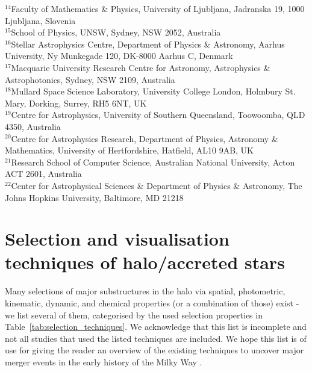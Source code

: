\documentclass[fleqn,usenatbib]{mnras}
\begin{document}
$^{14}$Faculty of Mathematics \& Physics, University of Ljubljana, Jadranska 19, 1000 Ljubljana, Slovenia\\
$^{15}$School of Physics, UNSW, Sydney, NSW 2052, Australia\\
$^{16}$Stellar Astrophysics Centre, Department of Physics \& Astronomy, Aarhus University, Ny Munkegade 120, DK-8000 Aarhus C, Denmark\\
$^{17}$Macquarie University Research Centre for Astronomy, Astrophysics \& Astrophotonics, Sydney, NSW 2109, Australia\\
$^{18}$Mullard Space Science Laboratory, University College London, Holmbury St. Mary, Dorking, Surrey, RH5 6NT, UK\\
$^{19}$Centre for Astrophysics, University of Southern Queensland, Toowoomba, QLD 4350, Australia\\
$^{20}$Centre for Astrophysics Research, Department of Physics, Astronomy \& Mathematics, University of Hertfordshire, Hatfield, AL10 9AB, UK\\
$^{21}$Research School of Computer Science, Australian National University, Acton ACT 2601, Australia\\
$^{22}$Center for Astrophysical Sciences \& Department of Physics \& Astronomy, The Johns Hopkins University, Baltimore, MD 21218


\appendix

\section{Selection and visualisation techniques of halo/accreted stars} \label{sec:selection_techniques}


Many selections of major substructures in the halo via spatial, photometric, kinematic, dynamic, and chemical properties (or a combination of those) exist - we list several of them, categorised by the used selection properties in Table~\ref{tab:selection_techniques}.
\newpage
We acknowledge that this list is incomplete and not all studies that used the listed techniques are included. We hope this list is of use for giving the reader an overview of the existing techniques to uncover major merger events in the early history of the Milky Way \citep[see][for a review]{Helmi2020}.
\end{document}
